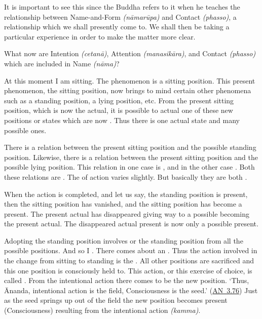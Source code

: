 It is important to see this since the Buddha refers to it when he teaches the relationship between Name-and-Form \emph{(nāmarūpa)} and Contact \emph{(phasso)}, a relationship which we shall presently come to. We shall then be taking a particular experience in order to make the matter more clear.

What now are Intention \emph{(cetanā)}, Attention \emph{(manasikāra)}, and Contact \emph{(phasso)} which are included in Name \emph{(nāma)}?

At this moment I am sitting. The  phenomenon is a sitting position. This present phenomenon, the sitting position, now brings to mind certain other phenomena such as a standing position, a lying position, etc. From the present sitting position, which is now the actual, it is possible to  actual one of these new positions or states which are now . Thus there is one actual state and many possible ones.

There is a relation between the present sitting position and the possible standing position. Likewise, there is a relation between the present sitting position and the possible lying position. This relation in one case is , and in the other case . Both these relations are . The  of action varies slightly. But basically they are both .

When the action is completed, and let us say, the standing position is present, then the sitting position has vanished, and the sitting position has become a  present. The present actual has disappeared giving way to a possible becoming the present actual. The disappeared actual present is now only a possible present.

Adopting the standing position involves  or  the standing position from all the possible positions. And so I . There comes about an . Thus the action involved in the change from sitting to standing is the . All other positions are sacrificed and this one position is consciously held to. This action, or this exercise of choice, is called . From the intentional action there comes to be  the new position. `Thus, Ānanda, intentional action is the field, Consciousness is the seed.' (\href{https://suttacentral.net/an3.76/en/thanissaro}{AN~3.76}) Just as the seed springs up out of the field the new position becomes present (Consciousness) resulting from the intentional action \emph{(kamma)}.

